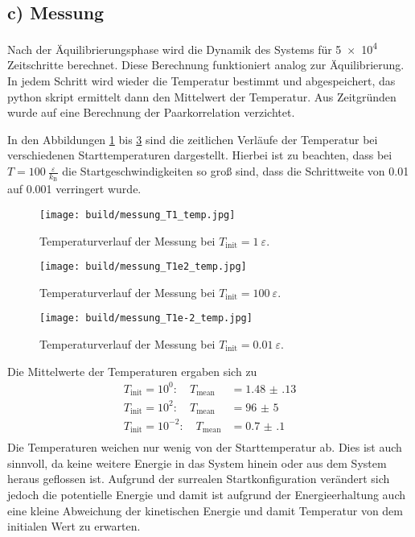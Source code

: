 \FloatBarrier
\subsection*{c) Messung}

Nach der Äquilibrierungsphase wird die Dynamik des Systems für \num{5e4} Zeitschritte
berechnet. Diese Berechnung funktioniert analog zur Äquilibrierung.
In jedem Schritt wird wieder die Temperatur bestimmt und abgespeichert, das
python skript ermittelt dann den Mittelwert der Temperatur.
Aus Zeitgründen wurde auf eine Berechnung der Paarkorrelation verzichtet.

In den Abbildungen \ref{fig:messung_T=1_temp} bis \ref{fig:messung_T=1e-2_temp}
sind die zeitlichen Verläufe der Temperatur
bei verschiedenen Starttemperaturen dargestellt.
Hierbei ist zu beachten, dass bei $T = 100\:\frac{\varepsilon}{k_\text{B}}$
die Startgeschwindigkeiten so groß sind, dass die Schrittweite von \num{0.01}
auf \num{0.001} verringert wurde.
\begin{figure}
    \centering
    \texttt{[image: build/messung\_T1\_temp.jpg]}
    \caption{Temperaturverlauf der Messung bei $T_\text{init} = 1\:\varepsilon$.}
    \label{fig:messung_T=1_temp}
\end{figure}
\begin{figure}
    \centering
    \texttt{[image: build/messung\_T1e2\_temp.jpg]}
    \caption{Temperaturverlauf der Messung bei $T_\text{init} = 100\:\varepsilon$.}
    \label{fig:messung_T=1e2_temp}
\end{figure}
\begin{figure}
    \centering
    \texttt{[image: build/messung\_T1e-2\_temp.jpg]}
    \caption{Temperaturverlauf der Messung bei $T_\text{init} = 0.01\:\varepsilon$.}
    \label{fig:messung_T=1e-2_temp}
\end{figure}

Die Mittelwerte der Temperaturen ergaben sich zu
\begin{align*}
    T_\text{init} = 10^0: \quad T_\text{mean} &= \num{1.48(13)} \\
    T_\text{init} = 10^2: \quad T_\text{mean} &= \num{96(5)} \\
    T_\text{init} = 10^{-2}: \quad T_\text{mean} &= \num{0.7(1)} \\
\end{align*}
Die Temperaturen weichen nur wenig von der Starttemperatur ab.
Dies ist auch sinnvoll, da keine weitere Energie in das System hinein oder aus dem
System heraus geflossen ist. Aufgrund der surrealen Startkonfiguration verändert sich
jedoch die potentielle Energie und damit ist aufgrund der Energieerhaltung auch eine
kleine Abweichung der kinetischen Energie und damit Temperatur von dem initialen Wert
zu erwarten.

